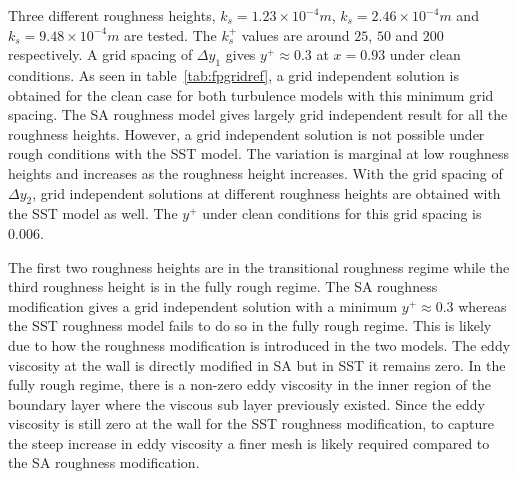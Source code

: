 Three different roughness heights, $k_s=1.23\times10^{-4} m$, $k_s=2.46\times10^{-4} m$ and $k_s=9.48\times10^{-4} m$ are tested. The $k_s^+$ values are around $25$, $50$ and $200$ respectively. A grid spacing of $\Delta y_1$ gives $y^+\approx0.3$ at $x=0.93$ under clean conditions. As seen in table~\ref{tab:fpgridref}, a grid independent solution is obtained for the clean case for both turbulence models with this minimum grid spacing. The SA roughness model gives largely grid independent result for all the roughness heights. However, a grid independent solution is not possible under rough conditions with the SST model. The variation is marginal at low roughness heights and increases as the roughness height increases. With the grid spacing of $\Delta y_2$, grid independent solutions at different roughness heights are obtained with the SST model as well. The $y^+$ under clean conditions for this grid spacing is $0.006$. 

The first two roughness heights are in the transitional roughness regime while the third roughness height is in the fully rough regime. The SA roughness modification gives a grid independent solution with a minimum $y^+\approx0.3$ whereas the SST roughness model fails to do so in the fully rough regime. This is likely due to how the roughness modification is introduced in the two models. The eddy viscosity at the wall is directly modified in SA but in SST it remains zero. In the fully rough regime, there is a non-zero eddy viscosity in the inner region of the boundary layer where the viscous sub layer previously existed. Since the eddy viscosity is still zero at the wall for the SST roughness modification, to capture the steep increase in eddy viscosity a finer mesh is likely required compared to the SA roughness modification. 
